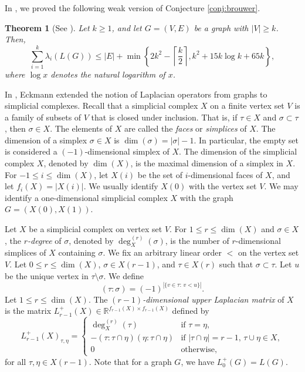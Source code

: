 \documentclass[a4paper,11pt]{article}
\theoremstyle{plain}
\newtheorem{theorem}{\bf Theorem}
\theoremstyle{definition}
\numberwithin{theorem}{section}
\numberwithin{equation}{section}
\newcommand{\Rea}{{\mathbb R}}
\newcommand{\ceilfrac}[2]{\left\lceil \frac{#1}{#2}\right\rceil}
\begin{document}
In \cite{lew2024partition}, we proved the following weak version of Conjecture \ref{conj:brouwer}.

\begin{theorem}[See {\cite[Theorem 1.3, Corollary 1.6]{lew2024partition}}]\label{thm:weak_brouwer}
    Let $k\ge 1$, and let $G=(V,E)$ be a graph with $|V|\ge k$. Then,
    \[
        \sum_{i=1}^k \lambda_i(L(G))\le |E| +\min \left\{2k^2 -\ceilfrac{k}{2}, k^2 + 15 k\log{k} +65k\right\},
    \]
    where $\log x$ denotes the natural logarithm of $x$.
\end{theorem}


In \cite{eckmann1945haromic}, Eckmann extended the notion of Laplacian operators from graphs to simplicial complexes. Recall that a simplicial complex $X$ on a finite vertex set $V$ is a family of subsets of $V$ that is closed under inclusion. That is, if $\tau\in X$ and $\sigma\subset \tau$, then $\sigma\in X$. The elements of $X$ are called the \emph{faces} or \emph{simplices} of $X$. The dimension of a simplex $\sigma\in X$ is $\dim(\sigma)=|\sigma|-1$. In particular, the empty set is considered a $(-1)$-dimensional simplex of $X$.
The dimension of the simplicial complex $X$, denoted by $\dim(X)$, is the maximal dimension of a simplex in $X$. For $-1\le i\le \dim(X)$, let $X(i)$ be the set of $i$-dimensional faces of $X$, and let $f_i(X)=|X(i)|$. We usually identify $X(0)$ with the vertex set $V$. We may identify a one-dimensional simplicial complex $X$ with the graph $G=(X(0),X(1))$.

Let $X$ be a simplicial complex on vertex set $V$. For $1\le r\le \dim(X)$ and $\sigma\in X$, the \emph{$r$-degree} of $\sigma$, denoted by $\deg_X^{(r)}(\sigma)$, is the number of $r$-dimensional simplices of $X$ containing $\sigma$. We fix an arbitrary linear order $<$ on the vertex set $V$. Let $0\le r\le \dim(X)$, $\sigma\in X(r-1)$, and $\tau\in X(r)$ such that $\sigma\subset \tau$. Let $u$ be the unique vertex in $\tau\setminus \sigma$. We define
\[
    (\tau:\sigma)= (-1)^{|\{v\in \tau:\, v<u\}|}.
\]
Let $1\le r\le \dim(X)$. The \emph{$(r-1)$-dimensional upper Laplacian matrix} of $X$ is the matrix $L_{r-1}^{+}(X)\in \Rea^{f_{r-1}(X)\times f_{r-1}(X)}$ defined by
\[
    L_{r-1}^{+}(X)_{\tau,\eta}= \begin{cases}
        \deg_{X}^{(r)}(\tau) & \text{if } \tau=\eta,\\
        -(\tau:\tau\cap \eta)(\eta:\tau\cap\eta) & \text{if } |\tau\cap \eta|=r-1,\, \tau\cup\eta\in X,\\
        0 & \text{otherwise,}
    \end{cases}
\]
for all $\tau,\eta\in X(r-1)$. Note that for a graph $G$, we have $L_0^{+}(G)=L(G)$.
\end{document}
